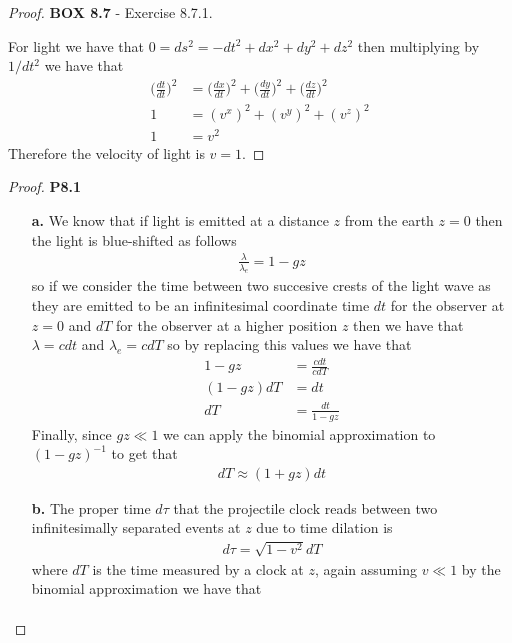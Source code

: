\documentclass[11pt]{article}
\theoremstyle{definition}
\begin{document}
\begin{proof}{\textbf{BOX 8.7} - Exercise 8.7.1.}

    For light we have that $0 = ds^2 = -dt^2 + dx^2 + dy^2 + dz^2$
    then multiplying  by $1/dt^2$ we have that
    \begin{align*}
        \bigg(\frac{dt}{dt}\bigg)^2
        &= \bigg(\frac{dx}{dt}\bigg)^2 + \bigg(\frac{dy}{dt}\bigg)^2
        + \bigg(\frac{dz}{dt}\bigg)^2\\
        1 &= (v^x)^2 + (v^y)^2 + (v^z)^2\\
        1 &= v^2
    \end{align*}
    Therefore the velocity of light is $v = 1$.
\end{proof}
\cleardoublepage
\begin{proof}{\textbf{P8.1}}
\begin{itemize}
    \item [\textbf{a.}]
    We know that if light is emitted at a distance $z$ from the earth $z=0$
    then the light is blue-shifted as follows
    \begin{align*}
        \frac{\lambda}{\lambda_e} = 1 - gz
    \end{align*}
    so if we consider the time between two succesive crests of the light wave
    as they are emitted to be an infinitesimal coordinate time $dt$ for
    the observer at $z=0$ and $dT$ for the observer at a higher position
    $z$ then we have that $\lambda = c dt$ and $\lambda_e = c dT$
    so by replacing this values we have that
    \begin{align*}
        1 - gz &= \frac{cdt}{cdT}\\
        (1 - gz)dT &= dt\\
        dT &= \frac{dt}{1 - gz}
    \end{align*}
    Finally, since $gz \ll 1$ we can apply the binomial approximation to
    $(1 - gz)^{-1}$ to get that
    \begin{align*}
        dT \approx (1 + gz)dt
    \end{align*}
    \item [\textbf{b.}]
    The proper time $d\tau$ that the projectile clock reads between two
    infinitesimally separated events at $z$ due to time dilation is
    \begin{align*}
        d\tau = \sqrt{1 - v^2} dT
    \end{align*}
    where $dT$ is the time measured by a clock at $z$, again assuming $v \ll 1$
    by the binomial approximation we have that
    \begin{align*}

\end{align*}
\end{itemize}
\end{proof}
\end{document}
